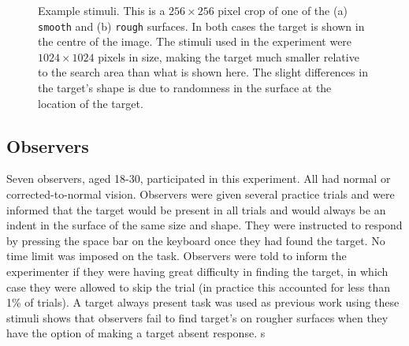 \documentclass[preprint, authoryear]{elsarticle} %
\begin{document}
\begin{figure}[tb]
	\centering
	\caption{Example stimuli. This is a $256\times 256$ pixel crop of one of the (a) \texttt{smooth} and (b) \texttt{rough} surfaces. In both cases the target is shown in the centre of the image. The stimuli used in the experiment were $1024\times 1024$ pixels in size, making the target much smaller relative to the search area than what is shown here. The slight differences in the target's shape is due to randomness in the surface at the location of the target.} 
	\label{fig:exampleStimuli}
\end{figure}

\subsection{Observers}
Seven observers, aged 18-30, participated in this experiment. All had normal or corrected-to-normal vision. Observers were given several practice trials and were informed that the target would be present in all trials and would always be an indent in the surface of the same size and shape. They were instructed to respond by pressing the space bar on the keyboard once they had found the target. No time limit was imposed on the task. Observers were told to inform the experimenter if they were having great difficulty in finding the target, in which case they were allowed to skip the trial (in practice this accounted for less than 1\% of trials). A target always present task was used as previous work \citep{clarke2008} using these stimuli shows that observers fail to find target's on rougher surfaces when they have the option of making a target absent response. s
\end{document}
